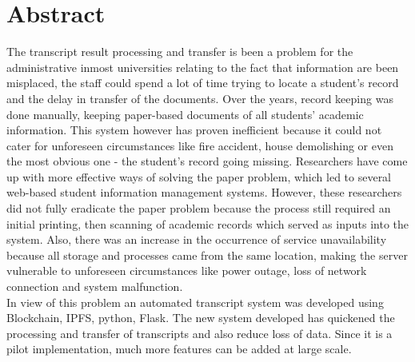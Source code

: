 \section*{Abstract}

The transcript result processing and transfer is been a problem for the administrative inmost universities relating to the fact that information are been misplaced, the staff could spend a lot of time trying to locate a student’s record and the delay in transfer of the documents. 
Over the years, record keeping was done manually, keeping paper-based documents of all students’ academic information. This system however has proven inefficient because it could not cater for unforeseen circumstances like fire accident, house demolishing or even the most obvious one - the student’s record going missing. Researchers have come up with more effective ways of solving the paper problem, which led to several web-based student information management systems. However, these researchers did not fully eradicate the paper problem because the process still required an initial printing, then scanning of academic records which served as inputs into the system. Also, there was an increase in the occurrence of service unavailability because all storage and processes came from the same location, making the server vulnerable to unforeseen circumstances like power outage, loss of network connection and system malfunction.\\ 

In view of this problem an automated transcript system was developed using Blockchain, IPFS, python, Flask. The new system developed has quickened the processing and transfer of transcripts and also reduce loss of data. Since it is a pilot implementation, much more features can be added at large scale.


\clearpage